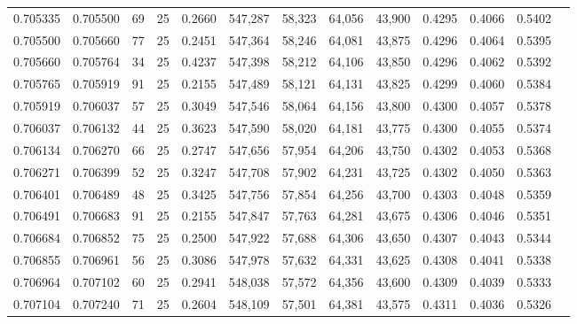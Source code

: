 \begin{tabular}{rrrrrrrrrrrrr}
0.705335 & 0.705500 &    69 &  25 &                                     0.2660 & 547,287 &  58,323 &  64,056 &  43,900 & 0.4295 & 0.4066 & 0.5402 \\
0.705500 & 0.705660 &    77 &  25 &                                     0.2451 & 547,364 &  58,246 &  64,081 &  43,875 & 0.4296 & 0.4064 & 0.5395 \\
0.705660 & 0.705764 &    34 &  25 &                                     0.4237 & 547,398 &  58,212 &  64,106 &  43,850 & 0.4296 & 0.4062 & 0.5392 \\
0.705765 & 0.705919 &    91 &  25 &                                     0.2155 & 547,489 &  58,121 &  64,131 &  43,825 & 0.4299 & 0.4060 & 0.5384 \\
0.705919 & 0.706037 &    57 &  25 &                                     0.3049 & 547,546 &  58,064 &  64,156 &  43,800 & 0.4300 & 0.4057 & 0.5378 \\
0.706037 & 0.706132 &    44 &  25 &                                     0.3623 & 547,590 &  58,020 &  64,181 &  43,775 & 0.4300 & 0.4055 & 0.5374 \\
0.706134 & 0.706270 &    66 &  25 &                                     0.2747 & 547,656 &  57,954 &  64,206 &  43,750 & 0.4302 & 0.4053 & 0.5368 \\
0.706271 & 0.706399 &    52 &  25 &                                     0.3247 & 547,708 &  57,902 &  64,231 &  43,725 & 0.4302 & 0.4050 & 0.5363 \\
0.706401 & 0.706489 &    48 &  25 &                                     0.3425 & 547,756 &  57,854 &  64,256 &  43,700 & 0.4303 & 0.4048 & 0.5359 \\
0.706491 & 0.706683 &    91 &  25 &                                     0.2155 & 547,847 &  57,763 &  64,281 &  43,675 & 0.4306 & 0.4046 & 0.5351 \\
0.706684 & 0.706852 &    75 &  25 &                                     0.2500 & 547,922 &  57,688 &  64,306 &  43,650 & 0.4307 & 0.4043 & 0.5344 \\
0.706855 & 0.706961 &    56 &  25 &                                     0.3086 & 547,978 &  57,632 &  64,331 &  43,625 & 0.4308 & 0.4041 & 0.5338 \\
0.706964 & 0.707102 &    60 &  25 &                                     0.2941 & 548,038 &  57,572 &  64,356 &  43,600 & 0.4309 & 0.4039 & 0.5333 \\
0.707104 & 0.707240 &    71 &  25 &                                     0.2604 & 548,109 &  57,501 &  64,381 &  43,575 & 0.4311 & 0.4036 & 0.5326 \\

\end{tabular}
